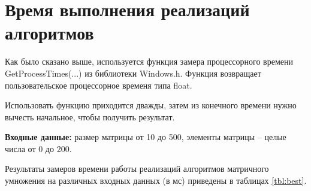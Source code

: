 \section{Время выполнения реализаций алгоритмов}

Как было сказано выше, используется функция замера процессорного времени GetProcessTimes(...) из библиотеки Windows.h. Функция возвращает пользовательское процессорное временя типа float.

Использовать функцию приходится дважды, затем из конечного времени нужно вычесть начальное, чтобы получить результат.

\textbf{Входные данные:} размер матрицы от 10 до 500, элементы матрицы -- целые числа от 0 до 200.

Результаты замеров времени работы реализаций алгоритмов матричного умножения на различных входных данных (в мс) приведены в таблицах \ref{tbl:best}.



